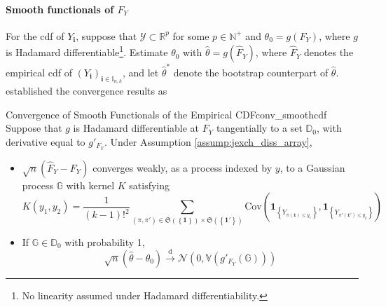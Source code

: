 \documentclass[twoside]{article}
\begin{document}
\paragraph*{Smooth functionals of $F_Y$} For the cdf of $Y_{\mathbf{i}}$, suppose that $\mathcal{Y}\subset \mathbb{R}^p$ for some $p\in\mathbb{N}^+$ and $\theta_0 = g(F_Y)$, where $g$ is Hadamard differentiable\footnote{No linearity assumed under Hadamard differentiability.}. Estimate $\theta_0$ with $\hat{\theta}=g\left(\hat{F}_Y\right)$, where $\hat{F}_Y$ denotes the empirical cdf of $\left(Y_{\mathbf{i}}\right)_{\mathbf{i}\in\mathbb{I}_{n,k}}$, and let $\hat{\theta}^*$ denote the bootstrap counterpart of $\hat{\theta}$.
\citet{davezies2021empirical} established the convergence results as 
\begin{theorem}{Convergence of Smooth Functionals of the Empirical CDF}{conv_smoothcdf}
    Suppose that $g$ is Hadamard differentiable at $F_Y$ tangentially to a set $\mathbb{D}_0$, with derivative equal to $g'_{F_Y}$. Under Assumption \ref{assump:jexch_diss_array},
    \begin{itemize}
        \item $\sqrt{n}\left( \hat{F}_Y-F_Y \right)$ converges weakly, as a process indexed by $y$, to a Gaussian process $\mathbb{G}$ with kernel $K$ satisfying 
        $$
        K\left(y_1,y_2\right) = \frac{1}{(k-1)!^2}\sum_{\left(\pi,\pi'\right)\in \mathfrak{S}\left(\left\{\mathbf{1}\right\}\right) \times \mathfrak{S}\left(\left\{\mathbf{1}'\right\}\right)}\mathrm{Cov}\left( \mathbf{1}_{\left\{Y_{\pi(\mathbf{1})\leq y_1}\right\}},\mathbf{1}_{\left\{Y_{\pi '(\mathbf{1}')\leq y_2}\right\}} \right)
        $$
        \item If $\mathbb{G}\in \mathbb{D}_0$ with probability 1, $$ \sqrt{n}\left(\hat{\theta}-\theta_0\right) \xrightarrow{\mathrm{d}} \mathcal{N}\left(0, \mathbb{V}\left(g'_{F_Y}\left(\mathbb{G}\right)\right)\right) $$
    \end{itemize}
\end{theorem}

\newpage


\end{document}

